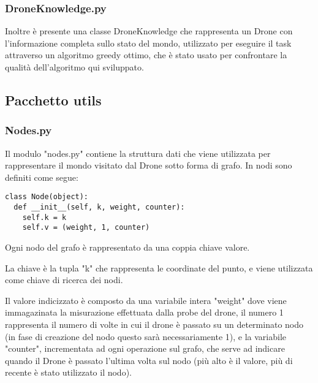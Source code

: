 \subsubsection{DroneKnowledge.py}
Inoltre è presente una classe DroneKnowledge che rappresenta un Drone con l'informazione completa sullo stato del mondo, utilizzato per eseguire il task attraverso un algoritmo greedy ottimo, che è stato usato per confrontare la qualità dell'algoritmo qui sviluppato.

\subsection{Pacchetto utils}

\subsubsection{Nodes.py}
Il modulo "nodes.py" contiene la struttura dati che viene utilizzata per rappresentare il mondo visitato dal Drone sotto forma di grafo. In nodi sono definiti come segue:
\begin{verbatim} 
class Node(object):
  def __init__(self, k, weight, counter):
    self.k = k
    self.v = (weight, 1, counter)
\end{verbatim}
Ogni nodo del grafo è rappresentato da una coppia chiave valore. 

La chiave è la tupla "k" che rappresenta le coordinate del punto, e viene utilizzata come chiave di ricerca dei nodi. 

Il valore indicizzato è composto da una variabile intera "weight" dove viene immagazinata la misurazione effettuata dalla probe del drone, il numero 1 rappresenta il numero di volte in cui il drone è passato su un determinato nodo (in fase di creazione del nodo questo sarà necessariamente 1), e la variabile "counter", incrementata ad ogni operazione sul grafo, che serve ad indicare quando il Drone è passato l'ultima volta sul nodo (più alto è il valore, più di recente è stato utilizzato il nodo). 

